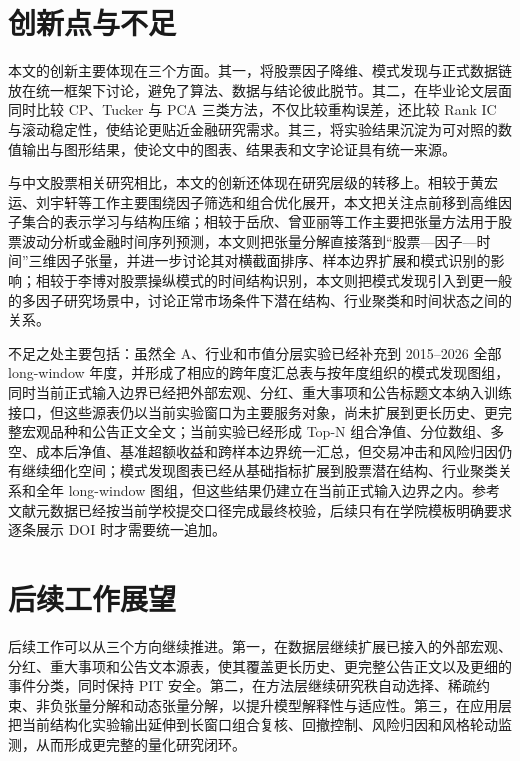\section{创新点与不足}

本文的创新主要体现在三个方面。其一，将股票因子降维、模式发现与正式数据链放在统一框架下讨论，避免了算法、数据与结论彼此脱节。其二，在毕业论文层面同时比较 CP、Tucker 与 PCA 三类方法，不仅比较重构误差，还比较 Rank IC 与滚动稳定性，使结论更贴近金融研究需求。其三，将实验结果沉淀为可对照的数值输出与图形结果，使论文中的图表、结果表和文字论证具有统一来源。

与中文股票相关研究相比，本文的创新还体现在研究层级的转移上。相较于黄宏运、刘宇轩等工作主要围绕因子筛选和组合优化展开，本文把关注点前移到高维因子集合的表示学习与结构压缩；相较于岳欣、曾亚丽等工作主要把张量方法用于股票波动分析或金融时间序列预测，本文则把张量分解直接落到“股票—因子—时间”三维因子张量，并进一步讨论其对横截面排序、样本边界扩展和模式识别的影响；相较于李博对股票操纵模式的时间结构识别，本文则把模式发现引入到更一般的多因子研究场景中，讨论正常市场条件下潜在结构、行业聚类和时间状态之间的关系。

不足之处主要包括：虽然全 A、行业和市值分层实验已经补充到 2015--2026 全部 long-window 年度，并形成了相应的跨年度汇总表与按年度组织的模式发现图组，同时当前正式输入边界已经把外部宏观、分红、重大事项和公告标题文本纳入训练接口，但这些源表仍以当前实验窗口为主要服务对象，尚未扩展到更长历史、更完整宏观品种和公告正文全文；当前实验已经形成 Top-N 组合净值、分位数组、多空、成本后净值、基准超额收益和跨样本边界统一汇总，但交易冲击和风险归因仍有继续细化空间；模式发现图表已经从基础指标扩展到股票潜在结构、行业聚类关系和全年 long-window 图组，但这些结果仍建立在当前正式输入边界之内。参考文献元数据已经按当前学校提交口径完成最终校验，后续只有在学院模板明确要求逐条展示 DOI 时才需要统一追加。

\section{后续工作展望}

后续工作可以从三个方向继续推进。第一，在数据层继续扩展已接入的外部宏观、分红、重大事项和公告文本源表，使其覆盖更长历史、更完整公告正文以及更细的事件分类，同时保持 PIT 安全。第二，在方法层继续研究秩自动选择、稀疏约束、非负张量分解和动态张量分解，以提升模型解释性与适应性。第三，在应用层把当前结构化实验输出延伸到长窗口组合复核、回撤控制、风险归因和风格轮动监测，从而形成更完整的量化研究闭环。

